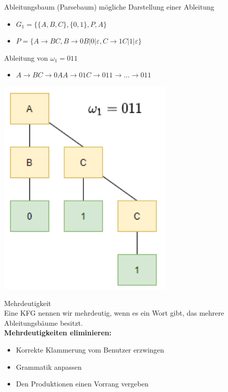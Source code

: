\begin{definition}{Ableitungsbaum (Parsebaum)} mögliche Darstellung einer Ableitung

    \begin{itemize}
    \item $G_{1}=\{\{A, B, C\},\{0,1\}, P, A\}$
    \item $P=\{A \rightarrow B C, B \rightarrow 0 B|0| \varepsilon, C \rightarrow 1 C|1| \varepsilon\}$
    \end{itemize}

    Ableitung von $\omega_{1}=011$

    \begin{itemize}
    \item $A \rightarrow B C \rightarrow 0 A A \rightarrow 01 C \rightarrow 011 \rightarrow \ldots \rightarrow 011$
    \end{itemize}
    \includegraphics[width=0.3\linewidth]{ableitungsbaum.png}
\end{definition}

\begin{concept}{Mehrdeutigkeit}\\
    Eine KFG nennen wir mehrdeutig, wenn es ein Wort gibt, das mehrere Ableitungsbäume besitzt.\\
    \textbf{Mehrdeutigkeiten eliminieren:}
    \begin{itemize}
    \item Korrekte Klammerung vom Benutzer erzwingen
    \item Grammatik anpassen
    \item Den Produktionen einen Vorrang vergeben
    \end{itemize}
\end{concept}

